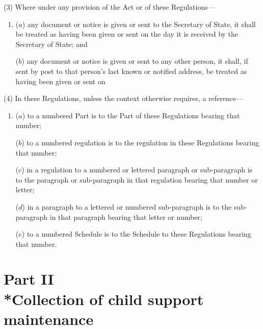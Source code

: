 \documentclass[12pt,a4paper]{article}
\begin{document}
(3) Where under any provision of the Act or of these Regulations—
\begin{enumerate}\item[]
($a$) any document or notice is given or sent to the Secretary of State, it shall be treated as having been given or sent on the day it is received by the Secretary of State; and

($b$) any document or notice is given or sent to any other person, it shall, if sent by post to that person’s last known or notified address, be treated as having been given or sent on 
\end{enumerate}

(4) In these Regulations, unless the context otherwise requires, a reference—
\begin{enumerate}\item[]
($a$) to a numbered Part is to the Part of these Regulations bearing that number;

($b$) to a numbered regulation is to the regulation in these Regulations bearing that number;

($c$) in a regulation to a numbered or lettered paragraph or sub-paragraph is to the paragraph or sub-paragraph in that regulation bearing that number or letter;

($d$) in a paragraph to a lettered or numbered sub-paragraph is to the sub-paragraph in that paragraph bearing that letter or number;

($e$) to a numbered Schedule is to the Schedule to these Regulations bearing that number.
\end{enumerate}


\section[Part II --- Collection of child support maintenance]{Part II\\*Collection of child support maintenance}
\end{document}
